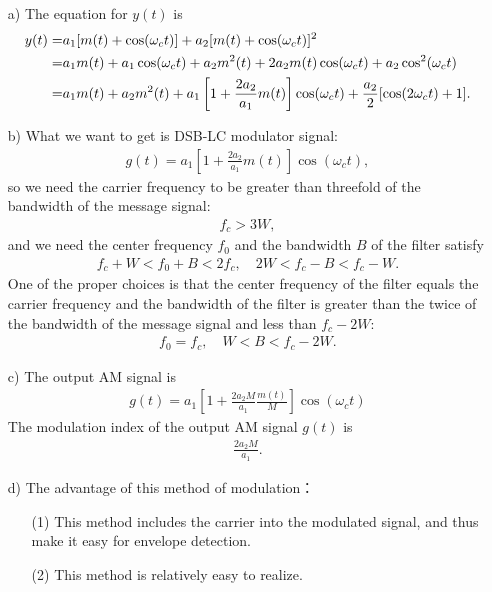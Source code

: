 \documentclass{assignment}
\begin{document}
\begin{sol}
    \begin{itemize}
        \item[a)] The equation for $y(t)$ is
        \begin{align}
            \notag y(t)=&a_1[m(t)+\cos(\omega_ct)]+a_2[m(t)+\cos(\omega_ct)]^2\\
            \notag=&a_1m(t)+a_1\cos(\omega_ct)+a_2m^2(t)+2a_2m(t)\cos(\omega_ct)+a_2\cos^2(\omega_ct)\\
            =&a_1m(t)+a_2m^2(t)+a_1\left[1+\frac{2a_2}{a_1}m(t)\right]\cos(\omega_ct)+\frac{a_2}{2}[\cos(2\omega_ct)+1].
        \end{align}
        \item[b)] What we want to get is DSB-LC modulator signal:
        \begin{align}
            g(t)=a_1\left[1+\frac{2a_2}{a_1}m(t)\right]\cos(\omega_ct),
        \end{align}
        so we need the carrier frequency to be greater than threefold of the bandwidth of the message signal:
        \begin{align}
            f_c>3W,
        \end{align}
        and we need the center frequency $f_0$ and the bandwidth $B$ of the filter satisfy
        \begin{align}
            f_c+W<f_0+B<2f_c,\quad 2W<f_c-B<f_c-W.
        \end{align}
        One of the proper choices is that the center frequency of the filter equals the carrier frequency and the bandwidth of the filter is greater than the twice of the bandwidth of the message signal and less than $f_c-2W$:
        \begin{align}
            f_0=f_c,\quad W<B<f_c-2W.
        \end{align}
        \item[c)] The output AM signal is
        \begin{align}
            g(t)=a_1\left[1+\frac{2a_2M}{a_1}\frac{m(t)}{M}\right]\cos(\omega_ct)
        \end{align}
        The modulation index of the output AM signal $g(t)$ is
        \begin{align}
            \frac{2a_2M}{a_1}.
        \end{align}
        \item[d)] The advantage of this method of modulation：
        \begin{itemize}
            \item[(1)] This method includes the carrier into the modulated signal, and thus make it easy for envelope detection.
            \item[(2)] This method is relatively easy to realize.
        \end{itemize}
    \end{itemize}
\end{sol}
\end{document}
